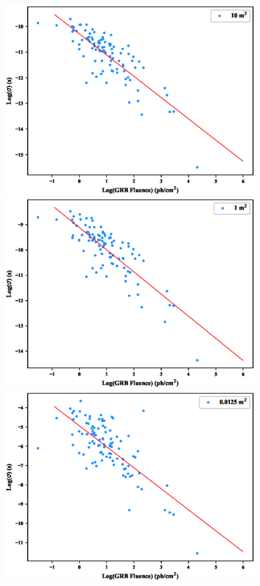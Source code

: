\documentclass[]{spie}  %
\begin{document}
\begin{figure}[h!]
\includegraphics[scale=0.5,angle=0]{fig/SHORT/sigma_vs_fluence_10.eps}
\includegraphics[scale=0.5,angle=0]{fig/SHORT/sigma_vs_fluence_1.eps}\\
\includegraphics[scale=0.5,angle=0]{fig/SHORT/sigma_vs_fluence_0.0125.eps}

\end{figure}
\end{document}
